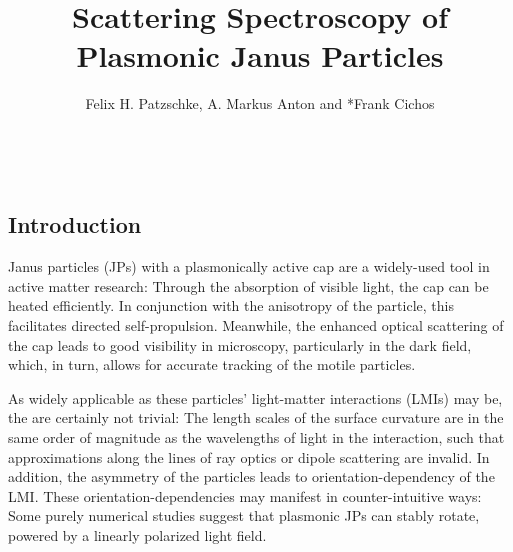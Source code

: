 \documentclass[10pt]{article}
\title{\sffamily\bfseries\color{Maroon} Scattering Spectroscopy of\\Plasmonic Janus Particles}
\author{Felix H. Patzschke, A. Markus Anton and *Frank Cichos}
\date{}
\begin{document}

\maketitle

\begin{abstract}\sffamily \vspace{-1em}  \\ \end{abstract}





\begin{multicols}{2}

\section*{Introduction}


Janus particles (JPs) with a plasmonically active cap are a widely-used tool in active matter research: 
Through the absorption of visible light, the cap can be heated efficiently. 
In conjunction with the anisotropy of the particle, this facilitates directed self-propulsion. 
Meanwhile, the enhanced optical scattering of the cap leads to good visibility in microscopy, particularly in the dark field, which, in turn, allows for accurate tracking of the motile particles. 


As widely applicable as these particles' light-matter interactions (LMIs) may be, the are certainly not trivial: 
The length scales of the surface curvature are in the same order of magnitude as the wavelengths of light in the interaction, such that approximations along the lines of ray optics or dipole scattering are invalid. 
In addition, the asymmetry of the particles leads to orientation-dependency of the LMI. 
These orientation-dependencies may manifest in counter-intuitive ways: 
Some purely numerical studies suggest that plasmonic JPs can stably rotate, powered by a linearly polarized light field. \cite{Ilic2017,BA}


\end{multicols}
\end{document}

